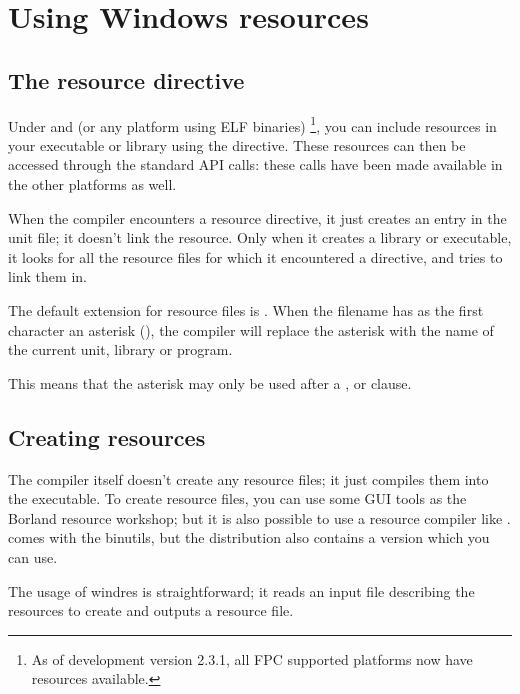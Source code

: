 \chapter{Using Windows resources}
\label{ch:windres}

\section{The resource directive }

Under \windows and \linux (or any platform using ELF binaries)
\footnote{As of development version 2.3.1, all FPC supported 
platforms now have resources available.}, 
you can include resources in your executable or library using 
the  directive. These resources can then
be accessed through the standard \windows API calls: these calls
have been made available in the other platforms as well.


When the compiler encounters a resource directive, it just creates an
entry in the unit  file; it doesn't link the resource. Only
when it creates a library or executable, it looks for all the resource
files for which it encountered a directive, and tries to link them in.

The default extension for resource files is . When the
filename has as the first character an asterisk (\var{*}), the
compiler will replace the asterisk with the name of the current unit,
library or program.

\begin{remark}This means that the asterisk may only be used after a ,
 or  clause.
\end{remark}

\section{Creating resources}

The \fpc compiler itself doesn't create any resource files; it just
compiles them into the executable. To create resource files, you
can use some GUI tools as the Borland resource workshop; but it is
also possible to use a \windows resource compiler like \gnu
{}.  comes with the \gnu binutils, but the
\fpc distribution also contains a version which you can use.

The usage of windres is straightforward; it reads an input file
describing the resources to create and outputs a resource file.

